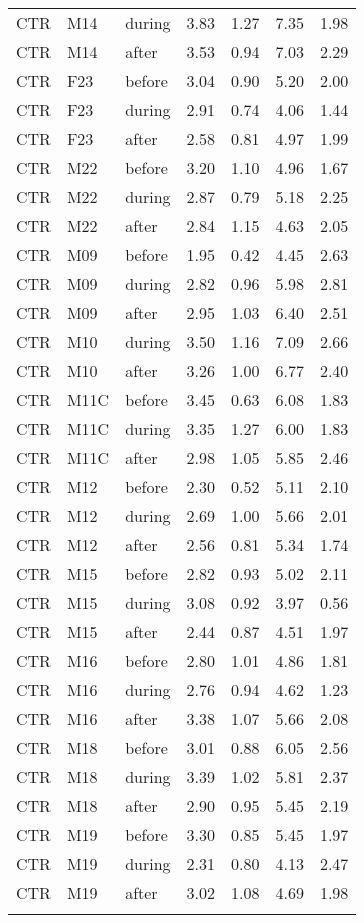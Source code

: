 \begin{longtable}{lllllll}
CTR & M14 & during & 3.83 & 1.27 & 7.35 & 1.98\\
CTR & M14 & after & 3.53 & 0.94 & 7.03 & 2.29\\
CTR & F23 & before & 3.04 & 0.90 & 5.20 & 2.00\\
CTR & F23 & during & 2.91 & 0.74 & 4.06 & 1.44\\
CTR & F23 & after & 2.58 & 0.81 & 4.97 & 1.99\\
CTR & M22 & before & 3.20 & 1.10 & 4.96 & 1.67\\
CTR & M22 & during & 2.87 & 0.79 & 5.18 & 2.25\\
CTR & M22 & after & 2.84 & 1.15 & 4.63 & 2.05\\
CTR & M09 & before & 1.95 & 0.42 & 4.45 & 2.63\\
CTR & M09 & during & 2.82 & 0.96 & 5.98 & 2.81\\
CTR & M09 & after & 2.95 & 1.03 & 6.40 & 2.51\\
CTR & M10 & during & 3.50 & 1.16 & 7.09 & 2.66\\
CTR & M10 & after & 3.26 & 1.00 & 6.77 & 2.40\\
CTR & M11C & before & 3.45 & 0.63 & 6.08 & 1.83\\
CTR & M11C & during & 3.35 & 1.27 & 6.00 & 1.83\\
CTR & M11C & after & 2.98 & 1.05 & 5.85 & 2.46\\
CTR & M12 & before & 2.30 & 0.52 & 5.11 & 2.10\\
CTR & M12 & during & 2.69 & 1.00 & 5.66 & 2.01\\
CTR & M12 & after & 2.56 & 0.81 & 5.34 & 1.74\\
CTR & M15 & before & 2.82 & 0.93 & 5.02 & 2.11\\
CTR & M15 & during & 3.08 & 0.92 & 3.97 & 0.56\\
CTR & M15 & after & 2.44 & 0.87 & 4.51 & 1.97\\
CTR & M16 & before & 2.80 & 1.01 & 4.86 & 1.81\\
CTR & M16 & during & 2.76 & 0.94 & 4.62 & 1.23\\
CTR & M16 & after & 3.38 & 1.07 & 5.66 & 2.08\\
CTR & M18 & before & 3.01 & 0.88 & 6.05 & 2.56\\
CTR & M18 & during & 3.39 & 1.02 & 5.81 & 2.37\\
CTR & M18 & after & 2.90 & 0.95 & 5.45 & 2.19\\
CTR & M19 & before & 3.30 & 0.85 & 5.45 & 1.97\\
CTR & M19 & during & 2.31 & 0.80 & 4.13 & 2.47\\
CTR & M19 & after & 3.02 & 1.08 & 4.69 & 1.98\\
\lspbottomrule
\end{longtable}

